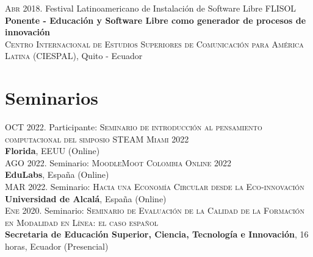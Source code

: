 \documentclass[a4paper]{article}
\begin{document}
\textsc{Abr} 2018. Festival Latinoamericano de Instalación de Software Libre \textsc{FLISOL} \\
\textbf{Ponente - Educación y Software Libre como generador de procesos de innovación}\\
\textsc{Centro Internacional de Estudios Superiores de Comunicación para América Latina (CIESPAL)}, Quito - Ecuador\\


\section{Seminarios}


\textsc{OCT} 2022. Participante: \textsc{Seminario de introducción al pensamiento computacional del simposio STEAM Miami 2022} \\
\textbf{ Florida}, EEUU (Online) \\

\textsc{AGO} 2022. Seminario: \textsc{MoodleMoot Colombia Online 2022} \\
\textbf{ EduLabs}, España (Online) \\

\textsc{MAR} 2022. Seminario: \textsc{Hacia una Economía Circular desde la Eco-innovación} \\
\textbf{ Universidad de Alcalá}, España (Online) \\


\textsc{Ene} 2020. Seminario: \textsc{Seminario de Evaluación de la Calidad de la Formación en Modalidad en Línea: el caso español} \\
\textbf{Secretaria de Educación Superior, Ciencia, Tecnología e Innovación}, 16 horas, Ecuador (Presencial) \\
\end{document}
